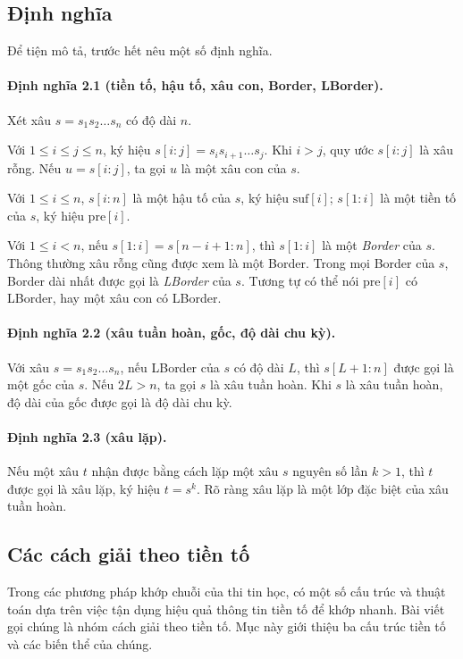 \documentclass[11pt]{article}
\begin{document}
\subsection{Định nghĩa}

Để tiện mô tả, trước hết nêu một số định nghĩa.

\paragraph{Định nghĩa 2.1 (tiền tố, hậu tố, xâu con, Border, LBorder).}
Xét xâu \(s=s_1s_2\ldots s_n\) có độ dài \(n\).

Với \(1\le i\le j\le n\), ký hiệu \(s[i:j]=s_is_{i+1}\ldots s_j\). Khi
\(i>j\), quy ước \(s[i:j]\) là xâu rỗng. Nếu \(u=s[i:j]\), ta gọi \(u\) là một
xâu con của \(s\).

Với \(1\le i\le n\), \(s[i:n]\) là một hậu tố của \(s\), ký hiệu
\(\mathrm{suf}[i]\); \(s[1:i]\) là một tiền tố của \(s\), ký hiệu
\(\mathrm{pre}[i]\).

Với \(1\le i<n\), nếu \(s[1:i]=s[n-i+1:n]\), thì \(s[1:i]\) là một
\emph{Border} của \(s\). Thông thường xâu rỗng cũng được xem là một Border.
Trong mọi Border của \(s\), Border dài nhất được gọi là \emph{LBorder} của
\(s\). Tương tự có thể nói \(\mathrm{pre}[i]\) có LBorder, hay một xâu con có
LBorder.

\paragraph{Định nghĩa 2.2 (xâu tuần hoàn, gốc, độ dài chu kỳ).}
Với xâu \(s=s_1s_2\ldots s_n\), nếu LBorder của \(s\) có độ dài \(L\), thì
\(s[L+1:n]\) được gọi là một gốc của \(s\). Nếu \(2L>n\), ta gọi \(s\) là xâu
tuần hoàn. Khi \(s\) là xâu tuần hoàn, độ dài của gốc được gọi là độ dài chu kỳ.

\paragraph{Định nghĩa 2.3 (xâu lặp).}
Nếu một xâu \(t\) nhận được bằng cách lặp một xâu \(s\) nguyên số lần
\(k>1\), thì \(t\) được gọi là xâu lặp, ký hiệu \(t=s^k\). Rõ ràng xâu lặp là
một lớp đặc biệt của xâu tuần hoàn.

\subsection{Các cách giải theo tiền tố}

Trong các phương pháp khớp chuỗi của thi tin học, có một số cấu trúc và thuật
toán dựa trên việc tận dụng hiệu quả thông tin tiền tố để khớp nhanh. Bài viết
gọi chúng là nhóm cách giải theo tiền tố. Mục này giới thiệu ba cấu trúc tiền tố
và các biến thể của chúng.
\end{document}
